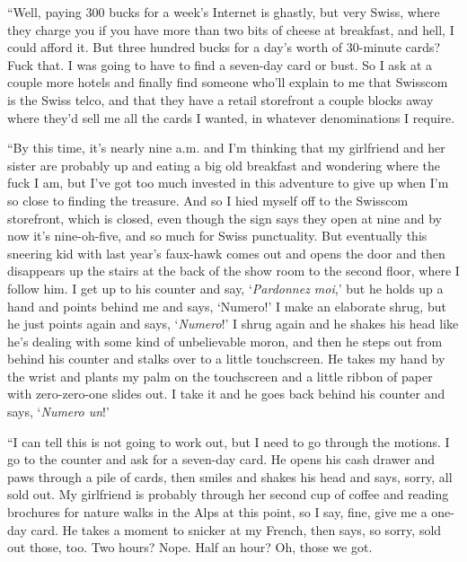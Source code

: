 ``Well, paying 300 bucks for a week's Internet is ghastly, but very
Swiss, where they charge you if you have more than two bits of cheese
at breakfast, and hell, I could afford it.  But three hundred bucks
for a day's worth of 30-minute cards?  Fuck that.  I was going to have
to find a seven-day card or bust.  So I ask at a couple more hotels
and finally find someone who'll explain to me that Swisscom is the
Swiss telco, and that they have a retail storefront a couple blocks
away where they'd sell me all the cards I wanted, in whatever
denominations I require.

``By this time, it's nearly nine a.m.  and I'm thinking that my
girlfriend and her sister are probably up and eating a big old
breakfast and wondering where the fuck I am, but I've got too much
invested in this adventure to give up when I'm so close to finding the
treasure.  And so I hied myself off to the Swisscom storefront, which
is closed, even though the sign says they open at nine and by now it's
nine-oh-five, and so much for Swiss punctuality.  But eventually this
sneering kid with last year's faux-hawk comes out and opens the door
and then disappears up the stairs at the back of the show room to the
second floor, where I follow him.  I get up to his counter and say,
`\textit{Pardonnez moi},' but he holds up a hand and points behind me
and says, `Numero!' I make an elaborate shrug, but he just points
again and says, `\textit{Numero}!' I shrug again and he shakes his
head like he's dealing with some kind of unbelievable moron, and then
he steps out from behind his counter and stalks over to a little
touchscreen.  He takes my hand by the wrist and plants my palm on the
touchscreen and a little ribbon of paper with zero-zero-one slides
out.  I take it and he goes back behind his counter and says,
`\textit{Numero un}!'

``I can tell this is not going to work out, but I need to go through
the motions.  I go to the counter and ask for a seven-day card.  He
opens his cash drawer and paws through a pile of cards, then smiles
and shakes his head and says, sorry, all sold out.  My girlfriend is
probably through her second cup of coffee and reading brochures for
nature walks in the Alps at this point, so I say, fine, give me a
one-day card.  He takes a moment to snicker at my French, then says,
so sorry, sold out those, too.  Two hours?  Nope.  Half an hour?  Oh,
those we got.

